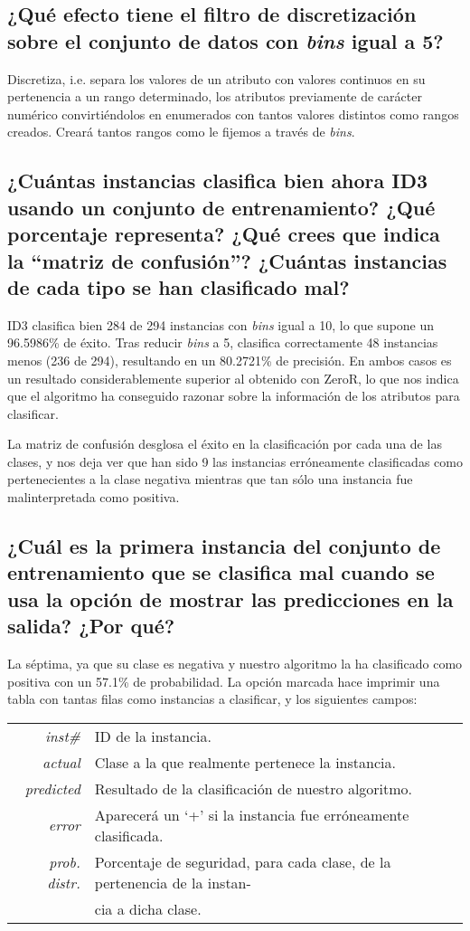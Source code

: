 \documentclass[12pt]{article}
\begin{document}
\subsection*{\small ¿Qué efecto tiene el filtro de discretización sobre el
conjunto de datos con \emph{bins} igual a 5?}

Discretiza, i.e. separa los valores de un atributo con valores continuos en su
pertenencia a un rango determinado, los atributos previamente de carácter
numérico convirtiéndolos en enumerados con tantos valores distintos como rangos
creados. Creará tantos rangos como le fijemos a través de \emph{bins}.

\subsection*{\small ¿Cuántas instancias clasifica bien ahora ID3 usando un
conjunto de entrenamiento? ¿Qué porcentaje representa? ¿Qué crees que indica
la ``matriz de confusión''? ¿Cuántas instancias de cada tipo se han clasificado
mal?}

ID3 clasifica bien 284 de 294 instancias con \emph{bins} igual a 10, lo que
supone un 96.5986\% de éxito. Tras reducir \emph{bins} a 5, clasifica
correctamente 48 instancias menos (236 de 294), resultando en un 80.2721\% de
precisión. En ambos casos es un resultado considerablemente superior al
obtenido con ZeroR, lo que nos indica que el algoritmo ha conseguido razonar
sobre la información de los atributos para clasificar.

La matriz de confusión desglosa el éxito en la clasificación por cada una de
las clases, y nos deja ver que han sido 9 las instancias erróneamente
clasificadas como pertenecientes a la clase negativa mientras que tan sólo una
instancia fue malinterpretada como positiva.

\subsection*{\small ¿Cuál es la primera instancia del conjunto de entrenamiento
que se clasifica mal cuando se usa la opción de mostrar las predicciones en la
salida? ¿Por qué?}

La séptima, ya que su clase es negativa y nuestro algoritmo la ha clasificado
como positiva con un 57.1\% de probabilidad. La opción marcada hace imprimir una
tabla con tantas filas como instancias a clasificar, y los siguientes campos:

\begin{tabular}{rl}
    \emph{inst\#} & ID de la instancia.\\
    \emph{actual} & Clase a la que realmente pertenece la instancia.\\
    \emph{predicted} & Resultado de la clasificación de nuestro algoritmo.\\
    \emph{error} & Aparecerá un `+' si la instancia fue erróneamente
    clasificada.\\
    \emph{prob. distr.} & Porcentaje de seguridad, para cada clase, de la
    pertenencia de la instan- \\ &cia a dicha clase.
\end{tabular}
\end{document}
